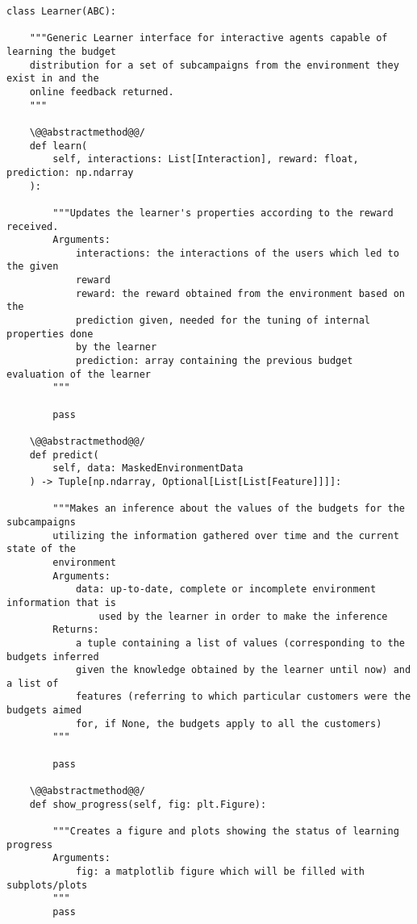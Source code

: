 \begin{lstlisting}[style=Python]
class Learner(ABC):

    """Generic Learner interface for interactive agents capable of learning the budget
    distribution for a set of subcampaigns from the environment they exist in and the
    online feedback returned.
    """

    \@@abstractmethod@@/
    def learn(
        self, interactions: List[Interaction], reward: float, prediction: np.ndarray
    ):

        """Updates the learner's properties according to the reward received.
        Arguments:
            interactions: the interactions of the users which led to the given
            reward
            reward: the reward obtained from the environment based on the
            prediction given, needed for the tuning of internal properties done
            by the learner
            prediction: array containing the previous budget evaluation of the learner
        """

        pass

    \@@abstractmethod@@/
    def predict(
        self, data: MaskedEnvironmentData
    ) -> Tuple[np.ndarray, Optional[List[List[Feature]]]]:

        """Makes an inference about the values of the budgets for the subcampaigns
        utilizing the information gathered over time and the current state of the
        environment
        Arguments:
            data: up-to-date, complete or incomplete environment information that is
                used by the learner in order to make the inference
        Returns:
            a tuple containing a list of values (corresponding to the budgets inferred
            given the knowledge obtained by the learner until now) and a list of
            features (referring to which particular customers were the budgets aimed
            for, if None, the budgets apply to all the customers)
        """

        pass

    \@@abstractmethod@@/
    def show_progress(self, fig: plt.Figure):

        """Creates a figure and plots showing the status of learning progress
        Arguments:
            fig: a matplotlib figure which will be filled with subplots/plots
        """
        pass
\end{lstlisting}
